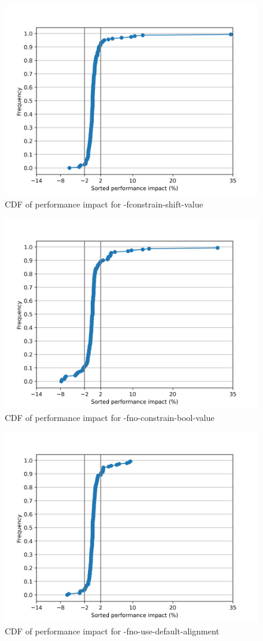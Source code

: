 \begin{figure}
\centering
\includegraphics{fconstrain-shift-value}
\caption{CDF of performance impact for -fconstrain-shift-value}
\end{figure}

\begin{figure}
\centering
\includegraphics{fno-constrain-bool-value}
\caption{CDF of performance impact for -fno-constrain-bool-value}
\end{figure}

\begin{figure}
\centering
\includegraphics{fno-use-default-alignment}
\caption{CDF of performance impact for -fno-use-default-alignment}
\end{figure}

